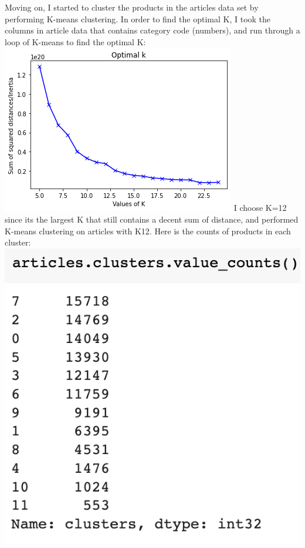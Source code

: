 \documentclass{article}
\begin{document}
Moving on, I started to cluster the products in the articles data set by performing K-means clustering. In order to find the optimal K, I took the columns in article data that contains category code (numbers), and run through a loop of K-means to find the optimal K: \\
\includegraphics[width=\textwidth]{images/optK.png}
I choose K=12 since its the largest K that still contains a decent sum of distance, and performed K-means clustering on articles with K12. Here is the counts of products in each cluster:\\
\includegraphics[]{images/12cluster.png}\\
\end{document}
